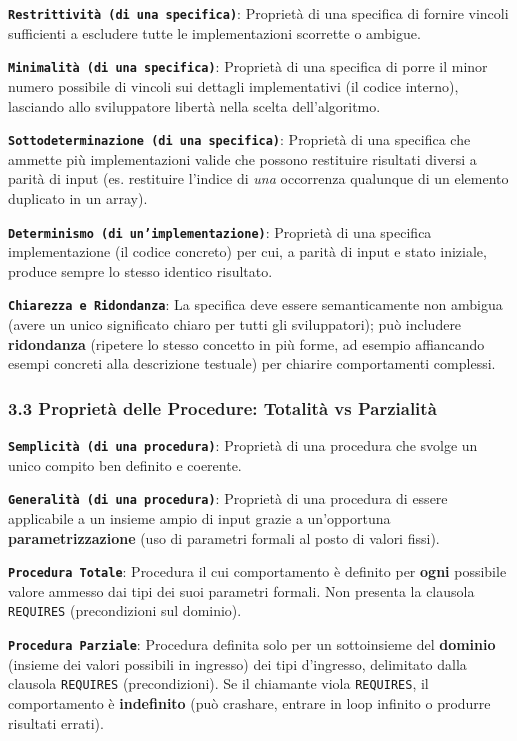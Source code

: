 \textbf{\texttt{Restrittività (di una specifica)}}: Proprietà di una specifica di fornire vincoli sufficienti a escludere tutte le implementazioni scorrette o ambigue.

\textbf{\texttt{Minimalità (di una specifica)}}: Proprietà di una specifica di porre il minor numero possibile di vincoli sui dettagli implementativi (il codice interno), lasciando allo sviluppatore libertà nella scelta dell'algoritmo.

\textbf{\texttt{Sottodeterminazione (di una specifica)}}: Proprietà di una specifica che ammette più implementazioni valide che possono restituire risultati diversi a parità di input (es. restituire l'indice di \emph{una} occorrenza qualunque di un elemento duplicato in un array).

\textbf{\texttt{Determinismo (di un'implementazione)}}: Proprietà di una specifica implementazione (il codice concreto) per cui, a parità di input e stato iniziale, produce sempre lo stesso identico risultato.

\textbf{\texttt{Chiarezza e Ridondanza}}: La specifica deve essere semanticamente non ambigua (avere un unico significato chiaro per tutti gli sviluppatori); può includere \textbf{ridondanza} (ripetere lo stesso concetto in più forme, ad esempio affiancando esempi concreti alla descrizione testuale) per chiarire comportamenti complessi.

\subsubsection{3.3 Proprietà delle Procedure: Totalità vs Parzialità}\label{3-3-proprieta-delle-procedure-totalita-vs-parzialita}

\textbf{\texttt{Semplicità (di una procedura)}}: Proprietà di una procedura che svolge un unico compito ben definito e coerente.

\textbf{\texttt{Generalità (di una procedura)}}: Proprietà di una procedura di essere applicabile a un insieme ampio di input grazie a un'opportuna \textbf{parametrizzazione} (uso di parametri formali al posto di valori fissi).

\textbf{\texttt{Procedura Totale}}: Procedura il cui comportamento è definito per \textbf{ogni} possibile valore ammesso dai tipi dei suoi parametri formali. Non presenta la clausola \texttt{REQUIRES} (precondizioni sul dominio).

\textbf{\texttt{Procedura Parziale}}: Procedura definita solo per un sottoinsieme del \textbf{dominio} (insieme dei valori possibili in ingresso) dei tipi d'ingresso, delimitato dalla clausola \texttt{REQUIRES} (precondizioni). Se il chiamante viola \texttt{REQUIRES}, il comportamento è \textbf{indefinito} (può crashare, entrare in loop infinito o produrre risultati errati).

